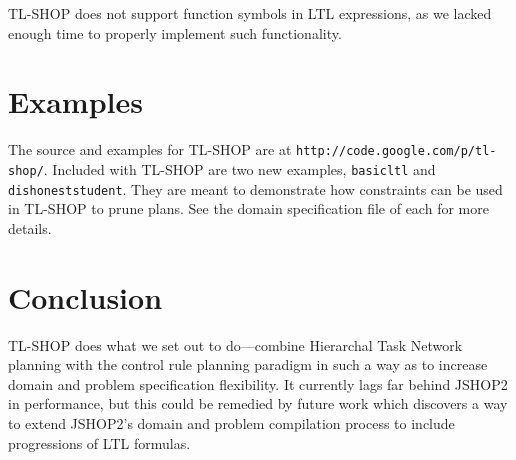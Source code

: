 \documentclass[12pt]{article}
\begin{document}
TL-SHOP does not support function symbols in LTL expressions, as we lacked 
enough time to properly implement such functionality.

\section{Examples}
The source and examples for TL-SHOP are at \texttt{http://code.google.com/p/tl-shop/}.
Included with TL-SHOP are two new examples, \texttt{basicltl} and
 \texttt{dishoneststudent}. They are meant to demonstrate how 
constraints can be used in TL-SHOP to prune plans. See the domain specification 
file of each for more details.

\section{Conclusion}
TL-SHOP does what we set out to do---combine Hierarchal Task Network planning 
with the control rule planning paradigm in such a way as to increase domain and 
problem specification flexibility. It currently lags far behind JSHOP2 in 
performance, but this could be remedied by future work which discovers a way to 
extend JSHOP2's domain and problem compilation process to include progressions 
of LTL formulas.



\end{document}
